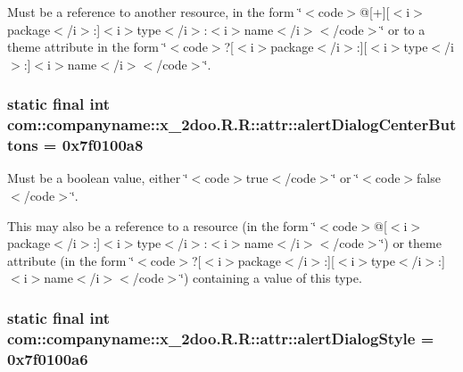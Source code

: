Must be a reference to another resource, in the form \char`\"{}$<$code$>$@\mbox{[}+\mbox{]}\mbox{[}$<$i$>$package$<$/i$>$:\mbox{]}$<$i$>$type$<$/i$>$:$<$i$>$name$<$/i$>$$<$/code$>$\char`\"{} or to a theme attribute in the form \char`\"{}$<$code$>$?\mbox{[}$<$i$>$package$<$/i$>$:\mbox{]}\mbox{[}$<$i$>$type$<$/i$>$:\mbox{]}$<$i$>$name$<$/i$>$$<$/code$>$\char`\"{}. \hypertarget{classcom_1_1companyname_1_1x__2doo_1_1_r_1_1attr_c8d25f7c896bd02184278843bcf2816e}{
\subsubsection[{alertDialogCenterButtons}]{\setlength{\rightskip}{0pt plus 5cm}static final int com::companyname::x\_\-2doo.R.R::attr::alertDialogCenterButtons = 0x7f0100a8}}
\label{classcom_1_1companyname_1_1x__2doo_1_1_r_1_1attr_c8d25f7c896bd02184278843bcf2816e}


Must be a boolean value, either \char`\"{}$<$code$>$true$<$/code$>$\char`\"{} or \char`\"{}$<$code$>$false$<$/code$>$\char`\"{}. 

This may also be a reference to a resource (in the form \char`\"{}$<$code$>$@\mbox{[}$<$i$>$package$<$/i$>$:\mbox{]}$<$i$>$type$<$/i$>$:$<$i$>$name$<$/i$>$$<$/code$>$\char`\"{}) or theme attribute (in the form \char`\"{}$<$code$>$?\mbox{[}$<$i$>$package$<$/i$>$:\mbox{]}\mbox{[}$<$i$>$type$<$/i$>$:\mbox{]}$<$i$>$name$<$/i$>$$<$/code$>$\char`\"{}) containing a value of this type. \hypertarget{classcom_1_1companyname_1_1x__2doo_1_1_r_1_1attr_ca8747c978fa93cc513a775a9affb210}{
\subsubsection[{alertDialogStyle}]{\setlength{\rightskip}{0pt plus 5cm}static final int com::companyname::x\_\-2doo.R.R::attr::alertDialogStyle = 0x7f0100a6}}
\label{classcom_1_1companyname_1_1x__2doo_1_1_r_1_1attr_ca8747c978fa93cc513a775a9affb210}


